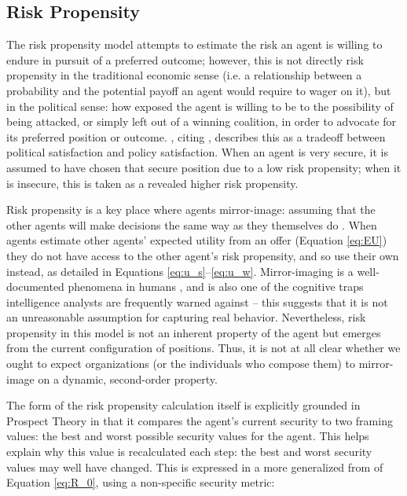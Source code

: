 \subsection{Risk Propensity}

The risk propensity model attempts to estimate the risk an agent is willing to endure in pursuit of a preferred outcome; however, this is not directly risk propensity in the traditional economic sense (i.e. a relationship between a probability and the potential payoff an agent would require to wager on it), but in the political sense: how exposed the agent is willing to be to the possibility of being attacked, or simply left out of a winning coalition, in order to advocate for its preferred position or outcome. \citet{bdm_2002}, citing \citet{lamborn_1991}, describes this as a tradeoff between political satisfaction and policy satisfaction. When an agent is very secure, it is assumed to have chosen that secure position due to a low risk propensity; when it is insecure, this is taken as a revealed higher risk propensity.

Risk propensity is a key place where agents mirror-image: assuming that the other agents will make decisions the same way as they themselves do \citep{heuer_2001}. When agents estimate other agents' expected utility from an offer (Equation \ref{eq:EU}) they do not have access to the other agent's risk propensity, and so use their own instead, as detailed in Equations \ref{eq:u_s}--\ref{eq:u_w}. Mirror-imaging is a well-documented phenomena in humans \citep{meltzoff_2003}, and is also one of the cognitive traps intelligence analysts are frequently warned against \citep{heuer_2001} -- this suggests that it is not an unreasonable assumption for capturing real behavior. Nevertheless, risk propensity in this model is not an inherent property of the agent but emerges from the current configuration of positions. Thus, it is not at all clear whether we ought to expect organizations (or the individuals who compose them) to mirror-image on a dynamic, second-order property.

The form of the risk propensity calculation itself is explicitly grounded in Prospect Theory \citep{kahneman_1984,mcdermott_2001} in that it compares the agent's current security to two framing values: the best and worst possible security values for the agent. This helps explain why this value is recalculated each step: the best and worst security values may well have changed. This is expressed in a more generalized from of Equation \ref{eq:R_0}, using a non-specific security metric:

